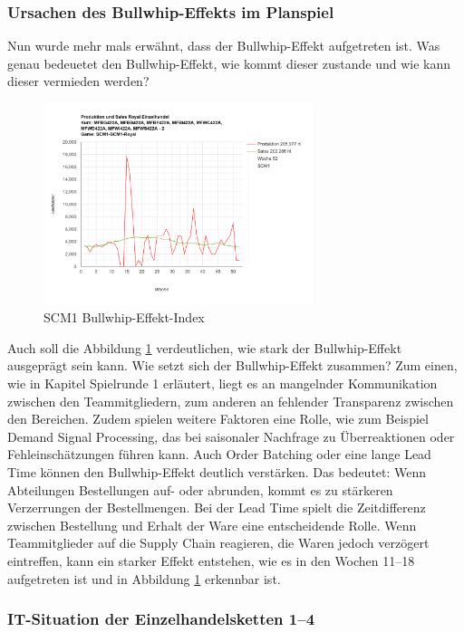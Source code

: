 \documentclass[a4paper,12pt]{article}
\begin{document}
\subsubsection{Ursachen des Bullwhip-Effekts im Planspiel}
Nun wurde mehr mals erwähnt, dass der Bullwhip-Effekt aufgetreten ist.
Was genau bedeuetet den Bullwhip-Effekt, wie kommt dieser zustande und wie kann dieser vermieden werden?
\begin{figure}[H]
    \centering
    \includegraphics[width=0.7\textwidth]{abbildungen/scm1/scm1bullwhipeffektindex.png}
    \caption{SCM1 Bullwhip-Effekt-Index}
    \label{fig:SCM1 Bullwhip-Effekt-Index}
\end{figure}
Auch soll die Abbildung \ref{fig:SCM1 Bullwhip-Effekt-Index} verdeutlichen, wie stark der Bullwhip-Effekt ausgeprägt sein kann.
Wie setzt sich der Bullwhip-Effekt zusammen? Zum einen, wie in Kapitel Spielrunde 1 erläutert, liegt es an mangelnder Kommunikation zwischen den Teammitgliedern,
 zum anderen an fehlender Transparenz zwischen den Bereichen.
Zudem spielen weitere Faktoren eine Rolle, wie zum Beispiel Demand Signal Processing, das bei saisonaler Nachfrage zu Überreaktionen oder Fehleinschätzungen führen kann.
Auch Order Batching oder eine lange Lead Time können den Bullwhip-Effekt deutlich verstärken.
Das bedeutet: Wenn Abteilungen Bestellungen auf- oder abrunden, kommt es zu stärkeren Verzerrungen der Bestellmengen.
Bei der Lead Time spielt die Zeitdifferenz zwischen Bestellung und Erhalt der Ware eine entscheidende Rolle.
Wenn Teammitglieder auf die Supply Chain reagieren, die Waren jedoch verzögert eintreffen, kann ein starker Effekt entstehen, wie es in den Wochen 11–18 aufgetreten ist und in Abbildung \ref{fig:SCM1 Bullwhip-Effekt-Index} erkennbar ist.

\subsubsection{IT-Situation der Einzelhandelsketten 1–4}
\end{document}

